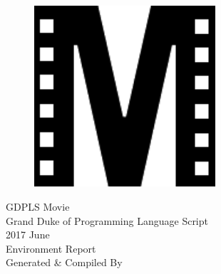 \documentclass[a4paper]{article}
\begin{document}
  \thispagestyle{empty}
  \begin{center}
    \bfseries
    \nbvspace[2]
    \begin{figure}[H]
      \centering
      \includegraphics[width=0.6\textwidth]{../logo.pdf}
    \end{figure}
    {\Huge GDPLS Movie} \\[10pt]
    {\LARGE\akaDora Grand Duke of Programming Language Script}\\[10pt]
    {\Huge 2017 June} \\
    \nbvspace[1]
    \Huge Environment Report\\
    \nbvspace[1]
    \normalsize Generated \& Compiled By \XeLaTeX
    \nbvspace[3]
  \end{center}
  \newpage

  

\end{document}
